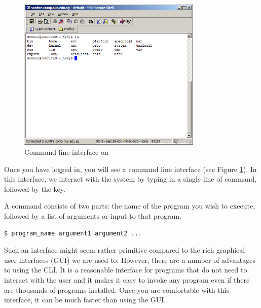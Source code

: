



\begin{frame}
\begin{figure}
\begin{center}
\includegraphics[width=250pt]{ssh_command_line}
\caption{Command line interface on }
\label{fig:cli}
\end{center}
\end{figure}
\end{frame}

Once you have logged in, you will see a command line interface (see Figure
\ref{fig:cli}). In this interface, we interact with the system by typing in a
single line of command, followed by the  key.

A command consists of two parts: the name of the program you wish to execute,
followed by a list of arguments or input to that program.  

\begin{frame}[fragile]
\begin{Large}
\begin{verbatim}
$ program_name argument1 argument2 ...
\end{verbatim}
\end{Large}
\end{frame}

Such an interface might seem rather primitive compared to the rich graphical
user interfaces (GUI) we are used to.  However, there are a number of advantages
to using the CLI. It is a reasonable interface for programs that do not need to
interact with the user and it makes it easy to invoke any program even if there
are thousands of programs installed. Once you are comfortable with this
interface, it can be much faster than using the GUI.  


